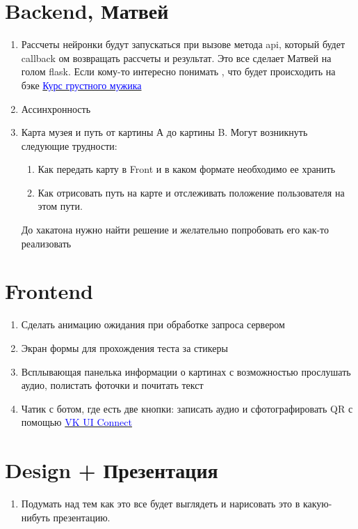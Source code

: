 \documentclass[11pt]{article}
\begin{document}
\section{Backend, {Матвей}}

\begin{enumerate}

\item Рассчеты нейронки будут запускаться при вызове метода api, который будет callback ом возвращать рассчеты и результат. Это все сделает Матвей на голом flask. Если кому-то интересно понимать , что будет происходить на бэке \href{https://blog.miguelgrinberg.com/post/the-flask-mega-tutorial-part-i-hello-world}{\textcolor{blue}{Курс грустного мужика}}
\item Ассинхронность 
\item Карта музея и путь от картины А до картины B. Могут возникнуть следующие трудности:
\begin{enumerate}
\item Как передать карту в Front и в каком формате необходимо ее хранить 
\item Как отрисовать путь на карте и отслеживать положение пользователя на этом пути. 
\end{enumerate}
До хакатона нужно найти решение и желательно попробовать его как-то реализовать
\end{enumerate}

\section{Frontend}
\begin{enumerate}
\item Сделать анимацию ожидания при обработке запроса сервером 

\item  Экран формы для прохождения теста за стикеры

\item Всплывающая панелька информации о картинах с возможностью прослушать аудио, полистать фоточки и почитать текст

\item Чатик с ботом, где есть две кнопки:  записать аудио и сфотографировать QR с помощью  \href{https://vk.com/dev/vk_apps_docs}{\textcolor{blue}{VK UI Connect}}
\end{enumerate}
\section{Design + Презентация}
\begin{enumerate}

\item  Подумать над тем как это все будет выглядеть и нарисовать это в какую-нибуть презентацию.


\end{enumerate}
\end{document}
